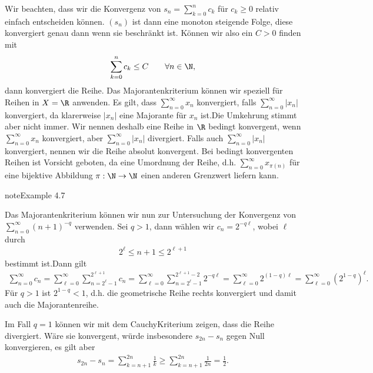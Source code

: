 \documentclass[letterpaper,10pt,english]{jupyterBook}
\begin{document}
Wir beachten, dass wir die Konvergenz von \(s_n=\sum_{k=0}^n c_k\) für \(c_k \geq 0\) relativ einfach entscheiden können. \((s_n)\) ist dann eine monoton steigende Folge, diese konvergiert genau dann wenn sie beschränkt ist. Können wir also ein \(C > 0\) finden mit
\begin{equation*}
\begin{split} \sum_{k=0}^n c_k \leq C \qquad \forall n \in \N ,\end{split}
\end{equation*}
dann konvergiert die Reihe.
Das Majorantenkriterium können wir speziell für Reihen in \(X=\R\) anwenden. Es gilt, dass \(\sum_{n=0}^\infty x_n\) konvergiert, falls  \(\sum_{n=0}^\infty |x_n|\)  konvergiert, da klarerweise \(|x_n|\) eine Majorante für \(x_n\) ist.Die Umkehrung stimmt aber nicht immer. Wir nennen deshalb eine Reihe in \(\R\) bedingt konvergent, wenn \(\sum_{n=0}^\infty x_n\) konvergiert, aber \(\sum_{n=0}^\infty |x_n|\)  divergiert. Falls auch \(\sum_{n=0}^\infty |x_n|\) konvergiert, nennen wir die Reihe absolut konvergent. Bei bedingt konvergenten Reihen ist Vorsicht geboten, da eine Umordnung der Reihe, d.h. \(\sum_{n=0}^\infty x_{\pi(n)}\) für eine bijektive Abbildung \(\pi: \N \rightarrow \N\) einen anderen Grenzwert liefern kann.
\label{metrik/reihen:example-6}
\begin{sphinxadmonition}{note}{Example 4.7}



Das Majorantenkriterium können wir nun zur Untersuchung der Konvergenz von \(\sum_{n=0}^\infty (n+1)^{-q}\) verwenden.
Sei \(q > 1\), dann wählen wir \(c_n = 2^{-q \ell}\), wobei \(\ell\) durch
\begin{equation*}
\begin{split} 2^\ell \leq n+1 \leq 2^{\ell+1}\end{split}
\end{equation*}
bestimmt ist.Dann gilt
\begin{equation*}
\begin{split} \sum_{n=0}^\infty c_n = \sum_{\ell=0}^\infty \sum_{n=2^\ell-1}^{2^{\ell+1}} c_n = \sum_{\ell=0}^\infty \sum_{n=2^\ell-1}^{2^{\ell+1}-2} 2^{-q\ell} =  \sum_{\ell=0}^\infty  2^{(1-q)\ell} = \sum_{\ell=0}^\infty  (2^{1-q})^\ell.\end{split}
\end{equation*}
Für \(q > 1\) ist \(2^{1-q} < 1\), d.h. die geometrische Reihe rechts konvergiert und damit auch die Majorantenreihe.

Im Fall \(q=1\) können wir mit dem Cauchy\sphinxhyphen{}Kriterium zeigen, dass die Reihe divergiert. Wäre sie konvergent, würde insbesondere \(s_{2n} -s_n\) gegen Null konvergieren, es gilt aber
\begin{equation*}
\begin{split} s_{2n} -s_n = \sum_{k=n+1}^{2n} \frac{1}k \geq \sum_{k=n+1}^{2n} \frac{1}{2n} = \frac{1}2.\end{split}
\end{equation*}\end{sphinxadmonition}
\end{document}
